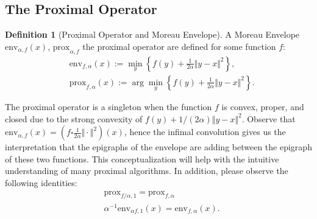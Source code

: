 \documentclass[]{article}
\theoremstyle{definition}
\newtheorem{prop}{Proposition}[section]  %
\newtheorem{definition}{Definition}
\begin{document}
    \subsection{The Proximal Operator}
        \begin{definition}[Proximal Operator and Moreau Envelope]
            A Moreau Envelope $\text{env}_{\alpha, f}(x)$, $\text{prox}_{\alpha, f}$ the proximal operator are defined for some function $f$: 
            $$
            \begin{aligned}
                & \text{env}_{f, \alpha}(x) := \min_{y}\left\lbrace
                    f(y) + \frac{1}{2 \alpha }\Vert y - x\Vert^2
                \right\rbrace, 
                \\
                & \text{prox}_{f, \alpha}(x) := 
                \arg\min_{y}\left\lbrace
                    f(y) + \frac{1}{2\alpha} \Vert y - x\Vert^2
                \right\rbrace. 
            \end{aligned}
            $$
        \end{definition}
        The proximal operator is a singleton when the function $f$ is convex, proper, and closed due to the strong convexity of $f(y) + 1/(2\alpha)\Vert y - x\Vert^2$. Observe that $\text{env}_{\alpha, f}(x) = (f\square \frac{1}{2\alpha}\Vert \cdot \Vert^2)(x)$, hence the infimal convolution gives us the interpretation that the epigraphs of the envelope are adding between the epigraph of these two functions. This conceptualization will help with the intuitive understanding of many proximal algorithms. 
        In addition, please observe the following identities: 
        $$
        \begin{aligned}
            & \text{prox}_{f/\alpha, 1} =  \text{prox}_{f, \alpha}
            \\
            & \alpha^{-1}\text{env}_{\alpha f, 1}(x) = \text{env}_{f, \alpha}(x). 
        \end{aligned}
        $$
\end{document}
